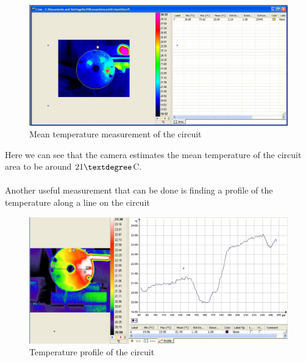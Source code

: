 \documentclass[english]{article}
\begin{document}
\begin{figure}[H]
	\centering
	\includegraphics[width=1\linewidth]{Pictures/max1.JPG}
	\caption{Mean temperature measurement of the circuit}
	\label{fig:three}
\end{figure}
Here we can see that the camera estimates the mean temperature of the circuit area to be around $21 \textdegree$C.\\
\\
Another useful measurement that can be done is finding a profile of the temperature along a line on the circuit\\
\begin{figure}[H]
	\centering
	\includegraphics[width=1\linewidth]{Pictures/profile.jpg}
	\caption{Temperature profile of the circuit}
	\label{fig}
\end{figure}
\end{document}
